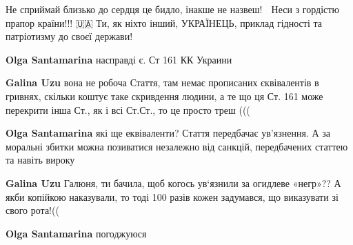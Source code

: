 \begin{itemize}
Не сприймай близько до сердця це бидло, інакше не назвеш! 🤬 Неси з гордістю
прапор країни!!! 🇺🇦 Ти, як ніхто інший, УКРАЇНЕЦЬ, приклад гідності та
патріотизму до своєї держави!

\begin{itemize}
 
\textbf{Olga Santamarina} насправді є. Ст 161 КК Украини

 
\textbf{Galina Uzu} вона не робоча Стаття, там немає прописаних єквівалентів в гривнях, скільки коштує таке скривдення людини, а те що ця Ст. 161 може перекрити інша Ст., як і всі Ст.Ст., то це просто треш (((

 
\textbf{Olga Santamarina} які ще еквіваленти? Стаття передбачає ув'язнення. А за моральні збитки можна позиватися незалежно від санкцій, передбачених статтею та навіть вироку

 
\textbf{Galina Uzu} Галюня, ти бачила, щоб когось ув‘язнили за огидлеве «негр»?? А якби копійкою наказували, то тоді 100 разів кожен задумався, що виказувати зі свого рота!((

 
\textbf{Olga Santamarina} погоджуюся


\end{itemize}
\end{itemize}
